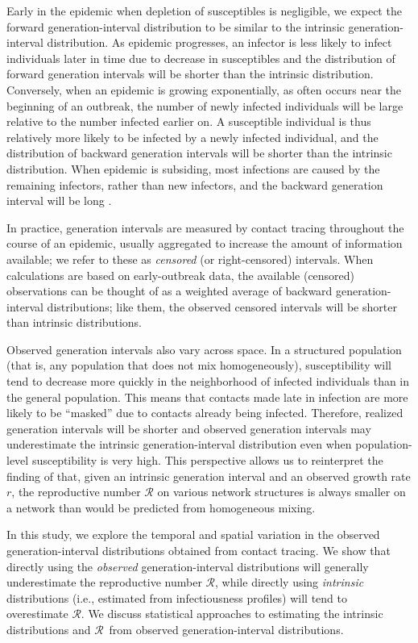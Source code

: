 \documentclass[12pt]{article}
\newcommand{\RR}{\ensuremath{{\mathcal R}}}
\begin{document}
Early in the epidemic when depletion of susceptibles is negligible, we expect the forward generation-interval distribution to be similar to the intrinsic generation-interval distribution.
As epidemic progresses, an infector is less likely to infect individuals later in time due to decrease in susceptibles and the distribution of forward generation intervals will be shorter than the intrinsic distribution.
Conversely, when an epidemic is growing exponentially, as often occurs near the beginning of an outbreak, the number of newly infected individuals will be large relative to the number infected earlier on. 
A susceptible individual is thus relatively more likely to be infected by a newly infected individual, and the distribution of backward generation intervals will be shorter than the intrinsic distribution.
When epidemic is subsiding, most infections are caused by the remaining infectors, rather than new infectors, and the backward generation interval will be long \citep{champredon2015intrinsic}.

In practice, generation intervals are measured by contact tracing throughout the course of an epidemic, usually aggregated to increase the amount of information available; we refer to these as \emph{censored} (or right-censored) intervals.
When calculations are based on early-outbreak data, the available (censored) observations can be thought of as a weighted average of backward generation-interval distributions; like them, the observed censored intervals will be shorter than intrinsic distributions.

Observed generation intervals also vary across space.
In a structured population (that is, any population that does not mix homogeneously), susceptibility will tend to decrease more quickly in the neighborhood of infected individuals than in the general population. 
This means that contacts made late in infection are more likely to be ``masked'' due to contacts already being infected.
Therefore, realized generation intervals will be shorter and observed generation intervals may underestimate the intrinsic generation-interval distribution even when population-level susceptibility is very high.
This perspective allows us to reinterpret the finding of \cite{trapman2016inferring} that, given an intrinsic generation interval and an observed growth rate $r$, the reproductive number $\RR$ on various network structures is always smaller on a network than would be predicted from homogeneous mixing.

In this study, we explore the temporal and spatial variation in the observed generation-interval distributions obtained from contact tracing.
We show that directly using the \emph{observed} generation-interval distributions will generally underestimate the reproductive number \RR, while directly using \emph{intrinsic} distributions (i.e., estimated from infectiousness profiles) will tend to overestimate \RR.
We discuss statistical approaches to estimating the intrinsic distributions and \RR\ from observed generation-interval distributions.
\end{document}
